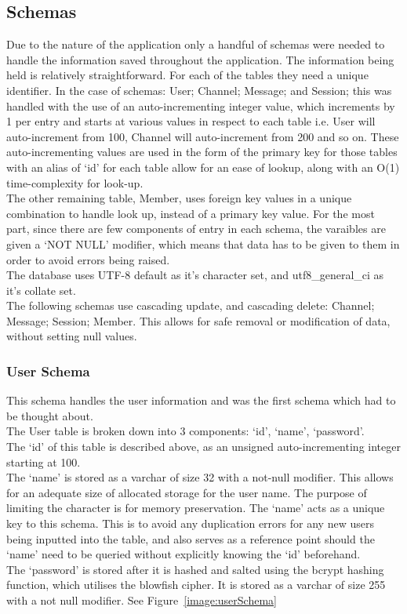 \subsection{Schemas}
Due to the nature of the application only a handful of schemas were needed to handle the information saved throughout the application. The information being held is relatively straightforward. For each of the tables they need a unique identifier. In the case of schemas: User; Channel; Message; and Session; this was handled with the use of an auto-incrementing integer value, which increments by 1 per entry and starts at various values in respect to each table i.e. User will auto-increment from 100, Channel will auto-increment from 200 and so on. These auto-incrementing values are used in the form of the primary key for those tables with an alias of ‘id’ for each table allow for an ease of lookup, along with an O(1) time-complexity for look-up.
\\ The other remaining table, Member, uses foreign key values in a unique combination to handle look up, instead of a primary key value. For the most part, since there are few components of entry in each schema, the varaibles are given a ‘NOT NULL’ modifier, which means that data has to be given to them in order to avoid errors being raised.
\\ The database uses UTF-8 default as it’s character set, and utf8\_general\_ci as it’s collate set.
\\ The following schemas use cascading update, and cascading delete: Channel; Message; Session; Member. This allows for safe removal or modification of data, without setting null values.

\subsubsection{User Schema}
This schema handles the user information and was the first schema which had to be thought about.
\\ The User table is broken down into 3 components: ‘id’, ‘name’, ‘password’.
\\The ‘id’ of this table is described above, as an unsigned auto-incrementing integer starting at 100.
\\The ‘name’ is stored as a varchar of size 32 with a not-null modifier. This allows for an adequate size of allocated storage for the user name. The purpose of limiting the character is for memory preservation. The ‘name’ acts as a unique key to this schema. This is to avoid any duplication errors for any new users being inputted into the table, and also serves as a reference point should the ‘name’ need to be queried without explicitly knowing the ‘id’ beforehand. 
\\The ‘password’ is stored after it is hashed and salted using the bcrypt hashing function, which utilises the blowfish cipher. It is stored as a varchar of size 255 with a not null modifier.
See Figure~\ref{image:userSchema}

